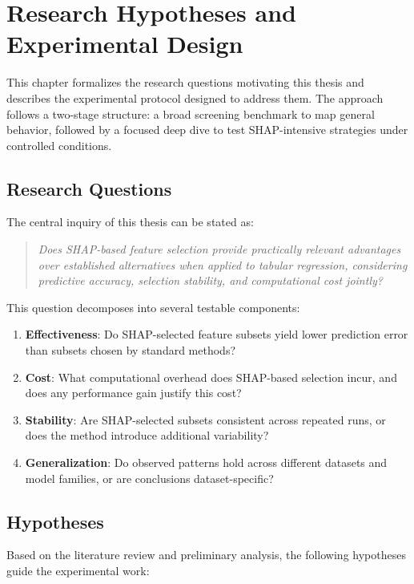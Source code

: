 \chapter{Research Hypotheses and Experimental Design}

This chapter formalizes the research questions motivating this thesis and describes the experimental protocol designed to address them. The approach follows a two-stage structure: a broad screening benchmark to map general behavior, followed by a focused deep dive to test SHAP-intensive strategies under controlled conditions.

\section{Research Questions}

The central inquiry of this thesis can be stated as:

\begin{quote}
\textit{Does SHAP-based feature selection provide practically relevant advantages over established alternatives when applied to tabular regression, considering predictive accuracy, selection stability, and computational cost jointly?}
\end{quote}

This question decomposes into several testable components:

\begin{enumerate}
    \item \textbf{Effectiveness}: Do SHAP-selected feature subsets yield lower prediction error than subsets chosen by standard methods?
    \item \textbf{Cost}: What computational overhead does SHAP-based selection incur, and does any performance gain justify this cost?
    \item \textbf{Stability}: Are SHAP-selected subsets consistent across repeated runs, or does the method introduce additional variability?
    \item \textbf{Generalization}: Do observed patterns hold across different datasets and model families, or are conclusions dataset-specific?
\end{enumerate}

\section{Hypotheses}

Based on the literature review and preliminary analysis, the following hypotheses guide the experimental work:

